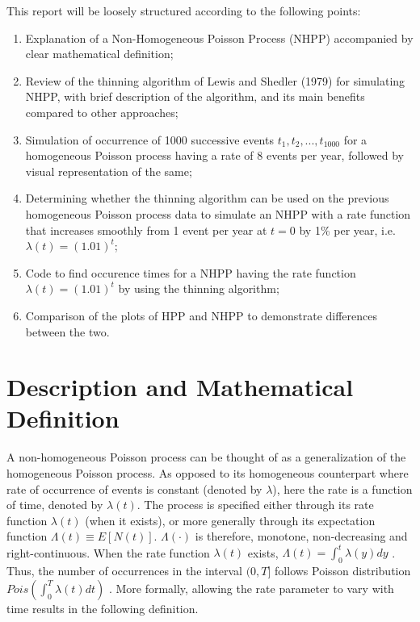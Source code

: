 \documentclass[%
 reprint,
 amsmath,amssymb,
 aps,
]{revtex4-2}
\theoremstyle{definition}
\begin{document}
This report will be loosely structured according to the following points:
\begin{enumerate}
\item Explanation of a Non-Homogeneous Poisson Process (NHPP) accompanied by clear mathematical definition;
\item Review of the thinning algorithm of Lewis and Shedler (1979) \cite{lewis_shedler_1979} for simulating NHPP, with brief description of the algorithm, and its main benefits compared to other approaches;
\item Simulation of occurrence of 1000 successive events ${t_1, t_2, . . . , t_{1000}}$ for a homogeneous Poisson process having a rate of 8 events per year, followed by visual representation of the same;

\item Determining whether the thinning algorithm can be used on the previous homogeneous Poisson process data to simulate an NHPP with a rate function that increases smoothly from 1 event per year at $t = 0$ by 1\% per year, i.e. $\lambda(t) = (1.01)^t$;
\item Code to find occurence times for a NHPP having the rate function $\lambda(t) = (1.01)^t$ by using the thinning algorithm;
\item Comparison of the plots of HPP and NHPP to demonstrate differences between the two.

\end{enumerate}

\section{\label{q:1}Description and Mathematical Definition}
A non-homogeneous Poisson process can be thought of as a generalization of the homogeneous Poisson process. As opposed to its homogeneous counterpart where rate of occurrence of events is constant (denoted by $\lambda$), here the rate is a function of time, denoted by $\lambda(t)$. The process is specified either through its rate function $\lambda(t)$ (when it exists), or more generally through its expectation function $\Lambda(t) \equiv  E[N(t)]$. $\Lambda(\cdot)$ is therefore, monotone, non-decreasing and right-continuous. When the rate function $\lambda(t)$ exists, $\Lambda(t) = \int_{0}^{t}\lambda(y) dy$ \cite{pasupathy}. Thus, the number of occurrences in the interval $(0,T]$ follows Poisson distribution $Pois(\int_{0}^{T}\lambda(t)dt)$ \cite{chen}. More formally, allowing the rate parameter to vary with time results in the following definition.
\end{document}
